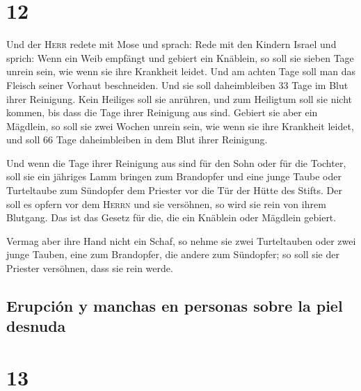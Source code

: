 \hypertarget{section-11}{%
\section{12}\label{section-11}}

 Und der \textsc{Herr} redete mit Mose und sprach:
 Rede mit den Kindern Israel und sprich: Wenn ein Weib
empfängt und gebiert ein Knäblein, so soll sie sieben Tage unrein sein,
wie wenn sie ihre Krankheit leidet.  Und am achten Tage
soll man das Fleisch seiner Vorhaut beschneiden.  Und sie
soll daheimbleiben 33 Tage im Blut ihrer Reinigung. Kein Heiliges soll
sie anrühren, und zum Heiligtum soll sie nicht kommen, bis dass die Tage
ihrer Reinigung aus sind.  Gebiert sie aber ein Mägdlein,
so soll sie zwei Wochen unrein sein, wie wenn sie ihre Krankheit leidet,
und soll 66 Tage daheimbleiben in dem Blut ihrer Reinigung.

 Und wenn die Tage ihrer Reinigung aus sind für den Sohn
oder für die Tochter, soll sie ein jähriges Lamm bringen zum Brandopfer
und eine junge Taube oder Turteltaube zum Sündopfer dem Priester vor die
Tür der Hütte des Stifts.  Der soll es opfern vor dem
\textsc{Herrn} und sie versöhnen, so wird sie rein von ihrem Blutgang.
Das ist das Gesetz für die, die ein Knäblein oder Mägdlein gebiert.

 Vermag aber ihre Hand nicht ein Schaf, so nehme sie zwei
Turteltauben oder zwei junge Tauben, eine zum Brandopfer, die andere zum
Sündopfer; so soll sie der Priester versöhnen, dass sie rein werde.

\hypertarget{erupciuxf3n-y-manchas-en-personas-sobre-la-piel-desnuda}{%
\subsection{Erupción y manchas en personas sobre la piel
desnuda}\label{erupciuxf3n-y-manchas-en-personas-sobre-la-piel-desnuda}}

\hypertarget{section-12}{%
\section{13}\label{section-12}}

